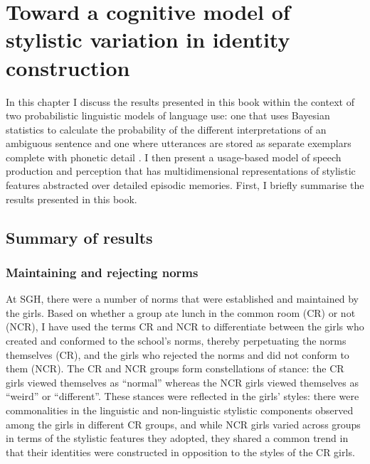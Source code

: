 \chapter{Toward a cognitive model of stylistic variation in identity construction}\label{ch:disc}

\date{}


\noindent In this chapter I discuss the results presented in this book within the context of two probabilistic linguistic models of language use: one that uses Bayesian statistics to calculate the probability of the different interpretations of an ambiguous sentence \citep{jurafsky1996,narayananjurafsky2002} and one where utterances are stored as separate exemplars complete with phonetic detail \citep{johnson1997,pierrehumbert2001}.  I then present a usage-based model of speech production and perception that has multidimensional representations of stylistic features abstracted over detailed episodic memories.  First, I briefly summarise the results presented in this book.


\section{Summary of results}
 \subsection{Maintaining and rejecting norms}

At SGH, there were a number of norms that were established and maintained by the girls.  Based on whether a group ate lunch in the common room (CR) or not (NCR), I have used the terms CR and NCR to differentiate between the girls who created and conformed to the school's norms, thereby perpetuating the norms themselves (CR), and the girls who rejected the norms and did not conform to them (NCR).  The CR and NCR groups form constellations of stance: the CR girls viewed themselves as ``normal'' whereas the NCR girls viewed themselves as ``weird'' or ``different''.  These stances were reflected in the girls' styles: there were commonalities in the linguistic and non-linguistic stylistic components observed among the girls in different CR groups, and while NCR girls varied across groups in terms of the stylistic features they adopted, they shared a common trend in that their identities were constructed in opposition to the styles of the CR girls.

